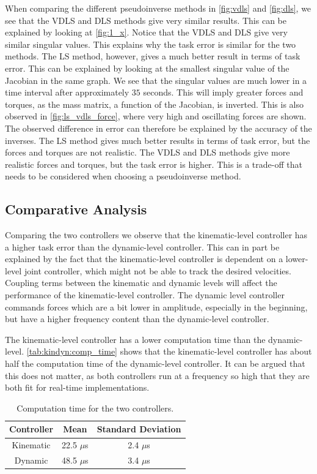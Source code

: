 When comparing the different pseudoinverse methods in \autoref{fig:vdls} and
\autoref{fig:dls}, we see that the VDLS and DLS methods give very similar results.
This can be explained by looking at \autoref{fig:1_x}. Notice that the VDLS and
DLS give very similar singular values. This explains why the task error is similar
for the two methods. The LS method, however, gives a much better result in terms
of task error. This can be explained by looking at the smallest singular value
of the Jacobian in the same graph. We see that the singular values are much lower
in a time interval after approximately $35$ seconds. This will imply greater
forces and torques, as the mass matrix, a function of the Jacobian, is inverted.
This is also observed in \autoref{fig:ls_vdls_force}, where very high and oscillating
forces are shown. The observed difference in error can therefore be explained by
the accuracy of the inverses. The LS method gives much better results in terms of
task error, but the forces and torques are not realistic. The VDLS and DLS methods
give more realistic forces and torques, but the task error is higher. This is a
trade-off that needs to be considered when choosing a pseudoinverse method.

\subsection{Comparative Analysis}

Comparing the two controllers we observe that the kinematic-level controller has
a higher task error than the dynamic-level controller. This can in part be explained
by the fact that the kinematic-level controller
is dependent on a lower-level joint controller, which might not be able to track
the desired velocities. Coupling terms between the kinematic and dynamic levels
will affect the performance of the kinematic-level controller. The dynamic level controller
commands forces which are a bit lower in amplitude, especially in the beginning,
but have a higher frequency content than the dynamic-level controller. 

The kinematic-level controller has a lower computation time than the dynamic-level.
\autoref{tab:kindyn:comp_time} shows that the kinematic-level controller has about
half the computation time of the dynamic-level controller. It can be argued that
this does not matter, as both controllers run at a frequency so high that they
are both fit for real-time implementations.
\begin{table}[h]
    \centering
    \begin{tabular}{|c|c|c|}
        \hline
        Controller & Mean & Standard Deviation \\ \hline
        Kinematic & 22.5 $\mu$s & 2.4 $\mu$s \\
        Dynamic & 48.5 $\mu$s & 3.4 $\mu$s \\ \hline
    \end{tabular}
    \caption{Computation time for the two controllers.}
    \label{tab:kindyn:comp_time}
\end{table}


